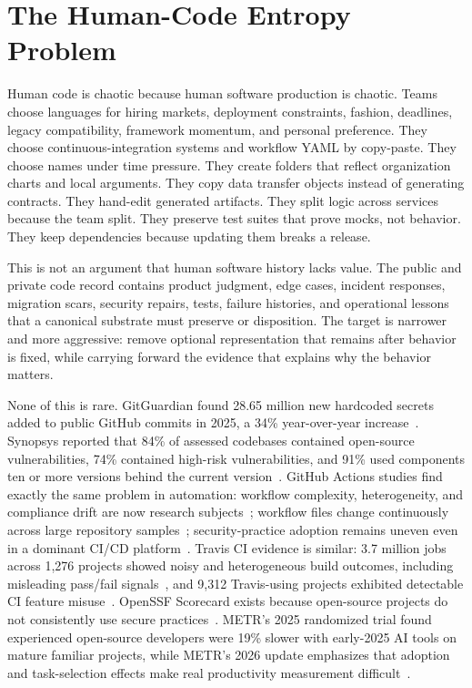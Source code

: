 \section{The Human-Code Entropy Problem}

Human code is chaotic because human software production is chaotic. Teams choose languages for hiring markets, deployment constraints, fashion, deadlines, legacy compatibility, framework momentum, and personal preference. They choose continuous-integration systems and workflow YAML by copy-paste. They choose names under time pressure. They create folders that reflect organization charts and local arguments. They copy data transfer objects instead of generating contracts. They hand-edit generated artifacts. They split logic across services because the team split. They preserve test suites that prove mocks, not behavior. They keep dependencies because updating them breaks a release.

This is not an argument that human software history lacks value. The public and private code record contains product judgment, edge cases, incident responses, migration scars, security repairs, tests, failure histories, and operational lessons that a canonical substrate must preserve or disposition. The target is narrower and more aggressive: remove optional representation that remains after behavior is fixed, while carrying forward the evidence that explains why the behavior matters.

None of this is rare. GitGuardian found 28.65 million new hardcoded secrets added to public GitHub commits in 2025, a 34\% year-over-year increase~\cite{gitguardian2026}. Synopsys reported that 84\% of assessed codebases contained open-source vulnerabilities, 74\% contained high-risk vulnerabilities, and 91\% used components ten or more versions behind the current version~\cite{synopsysOSSRA2024}. GitHub Actions studies find exactly the same problem in automation: workflow complexity, heterogeneity, and compliance drift are now research subjects~\cite{ghaHeterogeneity2025}; workflow files change continuously across large repository samples~\cite{ghaEvolution2026}; security-practice adoption remains uneven even in a dominant CI/CD platform~\cite{ghaSecurityNDSS2026}. Travis CI evidence is similar: 3.7 million jobs across 1,276 projects showed noisy and heterogeneous build outcomes, including misleading pass/fail signals~\cite{travisNoise2018}, and 9,312 Travis-using projects exhibited detectable CI feature misuse~\cite{travisMisuse2020}. OpenSSF Scorecard exists because open-source projects do not consistently use secure practices~\cite{openssfScorecard,scorecardPaper}. METR's 2025 randomized trial found experienced open-source developers were 19\% slower with early-2025 AI tools on mature familiar projects, while METR's 2026 update emphasizes that adoption and task-selection effects make real productivity measurement difficult~\cite{metr2025,metr2026}.

